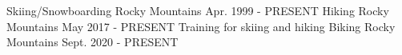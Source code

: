 

\begin{cventries}

  \cventry
    {} %
    {Skiing/Snowboarding} %
    {Rocky Mountains} %
    {Apr. 1999 - PRESENT} %
    {} %
    {} %
  \cventry
    {} %
    {Hiking} %
    {Rocky Mountains} %
    {May 2017 - PRESENT} %
    {} %
    {} %
  \cventry
    {Training for skiing and hiking} %
    {Biking} %
    {Rocky Mountains} %
    {Sept. 2020 - PRESENT} %
    {} %
    {} %
\end{cventries}
